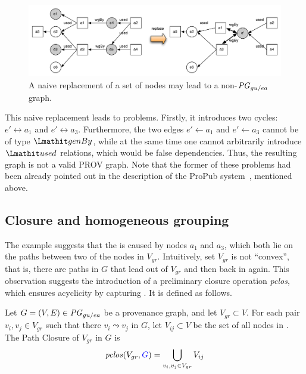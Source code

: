 \begin{figure}
\centering
\includegraphics[scale=.5]{figures/non-convex-ex-1.pdf} 
\caption{A naive replacement of a set of nodes may lead to a non-$\mathit{PG}_{gu/ea}$ graph.} \label{fig:non-convex-ex-1}
\end{figure}

This naive replacement leads to problems. Firstly, it introduces two cycles: $e'  \leftrightarrow a_1$ and $e'  \leftrightarrow a_3$. Furthermore, the two edges 
$e'  \leftarrow a_1$ and $e'  \leftarrow a_3$ cannot be of type $\wgby$, while at the same time one cannot arbitrarily introduce $\used$ relations, which would be false dependencies.
Thus, the resulting graph is not a valid PROV graph. Note that the former of these problems had been already pointed out in the description of the ProPub system~\citep{springerlink:10.1007/978-3-642-22351-8_13}, mentioned above.

\subsection{Closure and homogeneous grouping}
\label{sec:closure}

The example suggests that the  is caused by nodes $a_1$ and $a_3$, which both lie on the paths between two of the nodes in $V_{gr}$. Intuitively, set $V_{gr}$ is not ``convex'', that is, there are paths in $G$ that lead out of $V_{gr}$ and then back in again. This observation suggests the introduction of a preliminary closure operation \textit{pclos}, which ensures acyclicity by capturing . It is defined as follows.

\vspace*{10pt}
\begin{definition}
\label{def:clos}
Let $G = (V,E) \in \mathit{PG}_{gu/ea}$ be a provenance graph, and let $V_{gr} \subset V$.  
For each pair  $v_i, v_j \in V_{gr}$ such that there  $v_i \leadsto v_j$ in $G$, let $V_{ij} \subset V$ be the set of all nodes in .
The Path Closure of $V_{gr}$ in $G$ is
\[\clos(V_{gr}, \jwb{G})  =  \bigcup_{v_i, v_j \in V_{gr}} V_{ij} \]
\end{definition}

